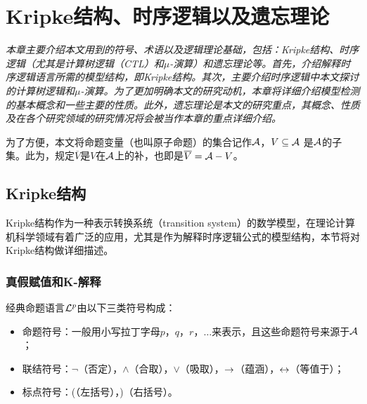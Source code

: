 \chapter{Kripke结构、时序逻辑以及遗忘理论}\label{chapter02}

{\em 本章主要介绍本文用到的符号、术语以及逻辑理论基础，包括：Kripke结构、时序逻辑（尤其是计算树逻辑（CTL）和$\mu$-演算）和遗忘理论等。首先，介绍解释时序逻辑语言所需的模型结构，即Kripke结构。其次，主要介绍时序逻辑中本文探讨的计算树逻辑和$\mu$-演算。为了更加明确本文的研究动机，本章将详细介绍模型检测的基本概念和一些主要的性质。此外，遗忘理论是本文的研究重点，其概念、性质及在各个研究领域的研究情况将会被当作本章的重点详细介绍。

为了方便，本文将命题变量（也叫原子命题）的集合记作$\cal A$，$V\subseteq {\cal A}$ 是$\cal A$的子集。此为，规定$\overline{V}$是$V$在${\cal A}$上的补，也即是$\overline{V}={\cal A}-V$。}

\section{Kripke结构}
Kripke结构作为一种表示转换系统（transition system）的数学模型，在理论计算机科学领域有着广泛的应用，尤其是作为解释时序逻辑公式的模型结构，本节将对Kripke结构做详细描述。

\subsection{真假赋值和K-解释}
经典命题语言${\cal L}^p$由以下三类符号构成：
\begin{itemize}
	\item 命题符号：一般用小写拉丁字母$p$，$q$，$r$，$\dots$来表示，且这些命题符号来源于${\cal A}$；
	\item 联结符号：$\neg$（否定），$\wedge$（合取），$\vee$（吸取），$\rightarrow$（蕴涵），$\leftrightarrow$（等值于）；
	\item 标点符号：(（左括号），)（右括号）。
\end{itemize}

